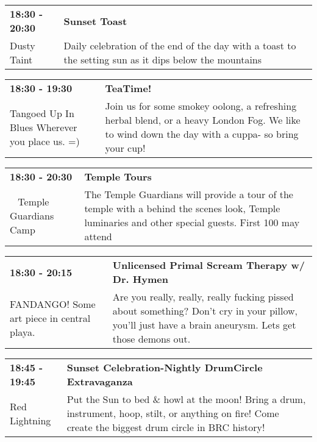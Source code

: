 \begin{tabular}{ p{1in} p{2.2in} }
    \textbf{18:30 - 20:30} & \textbf{Sunset Toast} \\
    Dusty Taint \newline  & Daily celebration of the end of the day with a toast to the setting sun as it dips below the mountains \\
    \hline 
\end{tabular}
    
\begin{tabular}{ p{1in} p{2.2in} }
    \textbf{18:30 - 19:30} & \textbf{TeaTime!} \\
    Tangoed Up In Blues \newline Wherever you place us. =) & Join us for some smokey oolong, a refreshing herbal blend, or a heavy London Fog.  We like to wind down the day with a cuppa- so bring your cup! \\
    \hline 
\end{tabular}
    
\begin{tabular}{ p{1in} p{2.2in} }
    \textbf{18:30 - 20:30} & \textbf{Temple Tours} \\
    ~ \newline Temple Guardians Camp & The Temple Guardians will provide a tour of the temple with a behind the scenes look, Temple luminaries and other special guests. First 100 may attend \\
    \hline 
\end{tabular}
    
\begin{tabular}{ p{1in} p{2.2in} }
    \textbf{18:30 - 20:15} & \textbf{Unlicensed Primal Scream Therapy w/ Dr. Hymen} \\
    FANDANGO! \newline Some art piece in central playa. & Are you really, really, really fucking pissed about something? Don't cry in your pillow, you'll just have a brain aneurysm. Lets get those demons out. \\
    \hline 
\end{tabular}
    
\begin{tabular}{ p{1in} p{2.2in} }
    \textbf{18:45 - 19:45} & \textbf{Sunset Celebration-Nightly DrumCircle Extravaganza} \\
    Red Lightning \newline  & Put the Sun to bed \& howl at the moon! Bring a drum, instrument, hoop, stilt, or anything on fire! Come create the biggest drum circle in BRC history! \\
    \hline 
\end{tabular}
    
